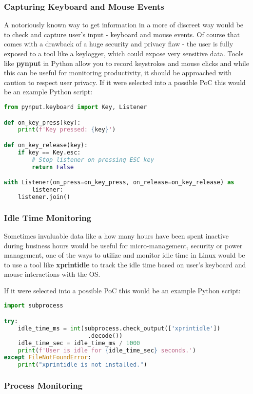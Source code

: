 \documentclass{VUMIFPSmagistrinis}
\begin{document}
\subsubsection{Capturing Keyboard and Mouse Events}
A notoriously known way to get information in a more of discreet way would be to check and capture user's input - keyboard and mouse events. Of course that comes with a drawback of a huge security and privacy flaw - the user is fully exposed to a tool like a keylogger, which could expose very sensitive data. Tools like \textbf{pynput} in Python allow you to record keystrokes and mouse clicks and while this can be useful for monitoring productivity, it should be approached with caution to respect user privacy. If it were selected into a possible PoC this would be an example Python script:
\begin{lstlisting}[language=Python]
from pynput.keyboard import Key, Listener

def on_key_press(key):
    print(f'Key pressed: {key}')

def on_key_release(key):
    if key == Key.esc:
        # Stop listener on pressing ESC key
        return False

with Listener(on_press=on_key_press, on_release=on_key_release) as 
        listener:
    listener.join()
\end{lstlisting}

\subsubsection{Idle Time Monitoring}
Sometimes invaluable data like a how many hours have been spent inactive during business hours would be useful for micro-management, security or power management, one of the ways to utilize and monitor idle time in Linux would be to use a tool like \textbf{xprintidle} to track the idle time based on user's keyboard and mouse interactions with the OS.

If it were selected into a possible PoC this would be an example Python script:
\begin{lstlisting}[language=Python]
import subprocess

try:
    idle_time_ms = int(subprocess.check_output(['xprintidle'])
                        .decode())
    idle_time_sec = idle_time_ms / 1000
    print(f'User is idle for {idle_time_sec} seconds.')
except FileNotFoundError:
    print("xprintidle is not installed.")
\end{lstlisting}

\subsubsection{Process Monitoring}
\end{document}
